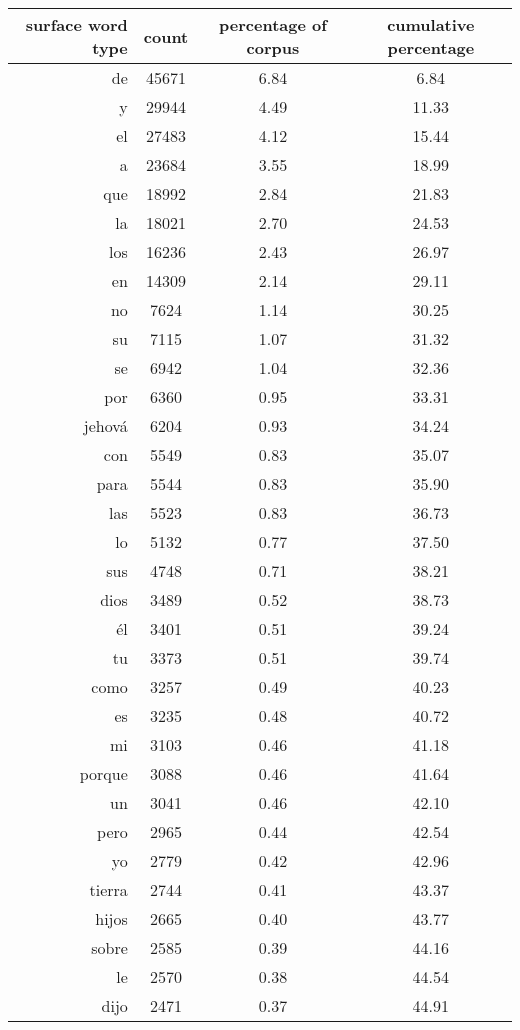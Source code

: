 \begin{figure*}
\begin{tiny}
\begin{centering}
\begin{tabular}{|r|c|c|c|}
\hline
surface word type & count & percentage of corpus & cumulative percentage \\
\hline
de & 45671 & 6.84 & 6.84 \\
y & 29944 & 4.49 & 11.33 \\
el & 27483 & 4.12 & 15.44 \\
a & 23684 & 3.55 & 18.99 \\
que & 18992 & 2.84 & 21.83 \\
la & 18021 & 2.70 & 24.53 \\
los & 16236 & 2.43 & 26.97 \\
en & 14309 & 2.14 & 29.11 \\
no & 7624 & 1.14 & 30.25 \\
su & 7115 & 1.07 & 31.32 \\
se & 6942 & 1.04 & 32.36 \\
por & 6360 & 0.95 & 33.31 \\
jehová & 6204 & 0.93 & 34.24 \\
con & 5549 & 0.83 & 35.07 \\
para & 5544 & 0.83 & 35.90 \\
las & 5523 & 0.83 & 36.73 \\
lo & 5132 & 0.77 & 37.50 \\
sus & 4748 & 0.71 & 38.21 \\
dios & 3489 & 0.52 & 38.73 \\
él & 3401 & 0.51 & 39.24 \\
tu & 3373 & 0.51 & 39.74 \\
como & 3257 & 0.49 & 40.23 \\
es & 3235 & 0.48 & 40.72 \\
mi & 3103 & 0.46 & 41.18 \\
porque & 3088 & 0.46 & 41.64 \\
un & 3041 & 0.46 & 42.10 \\
pero & 2965 & 0.44 & 42.54 \\
yo & 2779 & 0.42 & 42.96 \\
tierra & 2744 & 0.41 & 43.37 \\
hijos & 2665 & 0.40 & 43.77 \\
sobre & 2585 & 0.39 & 44.16 \\
le & 2570 & 0.38 & 44.54 \\
dijo & 2471 & 0.37 & 44.91 \\

\end{tabular}
\end{centering}
\end{tiny}
\end{figure*}
